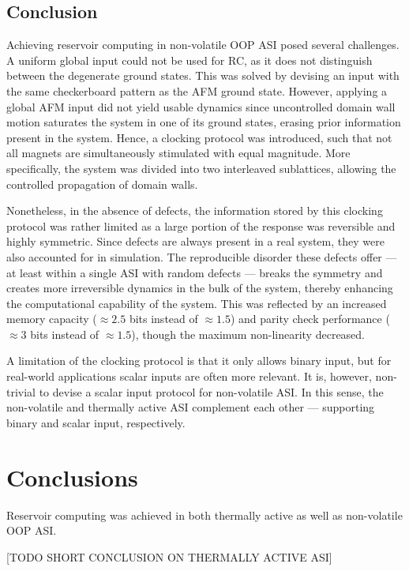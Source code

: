 \subsection{Conclusion}
Achieving reservoir computing in non-volatile OOP ASI posed several challenges.
A uniform global input could not be used for RC, as it does not distinguish between the degenerate ground states.
This was solved by devising an input with the same checkerboard pattern as the AFM ground state.
However, applying a global AFM input did not yield usable dynamics since uncontrolled domain wall motion saturates the system in one of its ground states, erasing prior information present in the system.
Hence, a clocking protocol was introduced, such that not all magnets are simultaneously stimulated with equal magnitude.
More specifically, the system was divided into two interleaved sublattices, allowing the controlled propagation of domain walls. \par
Nonetheless, in the absence of defects, the information stored by this clocking protocol was rather limited as a large portion of the response was reversible and highly symmetric.
Since defects are always present in a real system, they were also accounted for in simulation.
The reproducible disorder these defects offer --- at least within a single ASI with random defects --- breaks the symmetry and creates more irreversible dynamics in the bulk of the system, thereby enhancing the computational capability of the system.
This was reflected by an increased memory capacity ($\approx 2.5$ bits instead of $\approx 1.5$) and parity check performance ($\approx 3$ bits instead of $\approx 1.5$), though the maximum non-linearity decreased. \par
A limitation of the clocking protocol is that it only allows binary input, but for real-world applications scalar inputs are often more relevant.
It is, however, non-trivial to devise a scalar input protocol for non-volatile ASI.
In this sense, the non-volatile and thermally active ASI complement each other --- supporting binary and scalar input, respectively.

\section{Conclusions}
Reservoir computing was achieved in both thermally active as well as non-volatile OOP ASI.

[TODO SHORT CONCLUSION ON THERMALLY ACTIVE ASI] %

